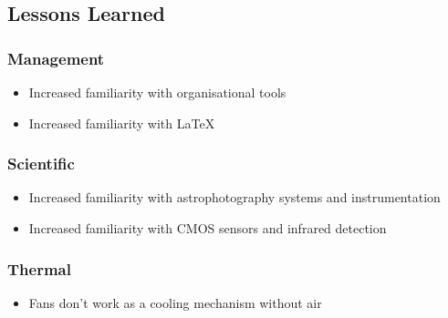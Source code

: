 \pagebreak
\subsection{Lessons Learned}

\subsubsection{Management}

\begin{itemize}
    \item Increased familiarity with organisational tools
    \item Increased familiarity with LaTeX
\end{itemize}


\subsubsection{Scientific}

\begin{itemize}
    \item Increased familiarity with astrophotography systems and instrumentation
    \item Increased familiarity with CMOS sensors and infrared detection
\end{itemize}

\begin{comment}
\subsubsection{Electrical}

\begin{itemize}
    \item Friendship
    \item Sleep deprivation
\end{itemize}


\subsubsection{Software }

\begin{itemize}
    \item Friendship
    \item Sleep deprivation
\end{itemize}


\subsubsection{Mechanical }

\begin{itemize}
    \item Friendship
    \item Sleep deprivation
\end{itemize}
 \end{comment}

\subsubsection{Thermal }
\begin{itemize}
    \item Fans don't work as a cooling mechanism without air
\end{itemize}
